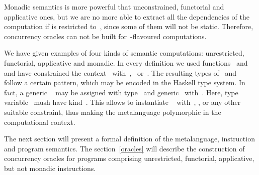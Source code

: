 Monadic semantics is more powerful that unconstrained, functorial and applicative ones,
but we are no more able to extract all the dependencies of the computation if
 is restricted to~, since some of them will not be static. Therefore,
concurrency oracles can not be built for~-flavoured computations.

We have given examples of four kinds of semantic computations: unrestricted, functorial,
applicative and monadic. In every definition we used functions~ and~
and have constrained the context~ with~,~
or~. The resulting types of~ and~ follow a certain
pattern, which may be encoded in the Haskell type system. In fact, a generic
~ may be assigned with type~ and
generic~ with~. Here,
type variable~ mush have kind~. This allows to instantiate
~ with~, ,  or any other suitable constraint,
thus making the metalanguage polymorphic in the computational context.

The next section will present a formal definition of the metalanguage, instruction
and program semantics. The section~\ref{oracles} will describe the construction of
concurrency oracles for programs comprising unrestricted, functorial, applicative,
but not monadic instructions.

